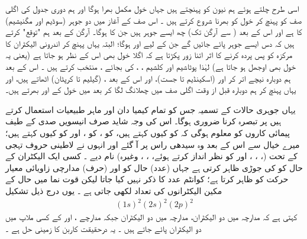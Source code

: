 
 اسی طرح چلتے ہوئے ہم  نیون     کو  پہنچتے ہیں جہاں      خول مکمل بھرا ہوگا اور ہم دوری جدول کی اگلی صف کو پہنچ کر      خول کو بھرنا شروع کرتے ہیں ۔ اس صف کے آغاز میں دو جوہر (سوڈیم اور مگنیشیم)   کا     ہے اور اس کے بعد (  سے آرگن تک) چھ ایسے جوہر ہیں جن کا    ہوگا۔ آرگن کے بعد ہم "توقع" کرتے ہیں کہ دس ایسے جوہر پائے جائیں گے جن کے لیے        اور        ہوگا؛ البتہ یہاں پہنچ کر   اندرونی الیکٹران کا مرکزہ کو پس پردہ کرنے کا اثر اتنا زور پکڑتا ہے کہ اگلا خول بھی اس کے نظر ہو جاتا ہے (یعنی یہ خول بھی  اوجھل ہو  جاتا ہے)   لہٰذا  پوٹاشیم      اور کلشیم      ،   ،    کی
  بجائے  ،    منتخب کرتے ہیں  ۔ اس کے بعد ہم  دوبارہ نیچے اتر کر      اور   (اسکینڈیم تا   جست)،  اور اس کے بعد ،  (گیلیم تا  کرپٹان) اٹھاتے ہیں، اور یہاں پہنچ کر  ہم دوبارہ قبل از وقت اگلی صف       میں چھلانگ لگا کر  بعد میں   خول کے  اور  بھرتے ہیں۔
  
 یہاں جوہری حالات کے  تسمیہ  جس کو  تمام  کیمیا دان  اور ماہر طبیعیات  استعمال کرتے ہیں پر تبصرہ کرنا ضروری ہوگا۔ اس کی وجہ شاید صرف انیسویں صدی کے طیف  پیمائی  کاروں کو معلوم ہوگی کہ        کو کیوں           کہتے ہیں،            کو           ،           کو    ، اور                 کو کیوں     کہتے ہیں؛ میرے خیال سے اس کے بعد وہ سیدھی راس پر آ گئے اور انہوں نے لاطینی  حروف تہجی کے تحت (، ، ،  اور            کو نظر انداز کرتے ہوئے،  ،  ، وغیرہ)  نام دیے ۔ کسی ایک الیکٹران کے حال کو           کی جوڑی ظاہر کرتی ہے جہاں  (عدد)     حال کو اور (حرف)             مدارچی زاویائی معیار حرکت کو ظاہر کرتا ہے؛ کوانٹم عدد            کا  ذکر نہیں کیا جاتا لیکن قوت نما میں حال کے مکین الیکٹرانوں کی تعداد لکھی جاتی ہے ۔ یوں درج ذیل تشکیل
\begin{align}\label{مساوات_متماثل_الیکٹرانی_تشکیل}
(1s)^{2}(2s)^{2}(2p)^{2} 
\end{align}
کہتی ہے کہ مدارچہ   میں  دو  الیکٹران،  مدارچہ   میں  دو الیکٹران   جبکہ مدارچے   ،    اور    کے کسی ملاپ میں  دو   الیکٹران پائے جاتے ہیں ۔ یہ درحقیقت کاربن کا زمینی حل ہے ۔ 


